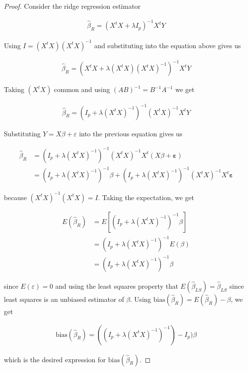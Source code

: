 \documentclass[paper=a4, fontsize=11pt]{scrartcl} %
\numberwithin{equation}{section} %
\begin{document}
\begin{proof}

Consider the ridge regression estimator

\begin{align}
\hat{\beta}_R = (X^t X + \lambda I_p)^{-1} X^t Y
\end{align}

Using $I = (X^t X)(X^t X)^{-1}$ and substituting into the equation above gives us

\begin{align}
\hat{\beta}_R = (X^t X + \lambda (X^t X)(X^t X)^{-1})^{-1} X^t Y
\end{align}

Taking $(X^t X)$ common and using $(AB)^{-1} = B^{-1}A^{-1}$ we get

\begin{align}
\hat{\beta}_R = (I_p + \lambda (X^t X)^{-1})^{-1} (X^t X)^{-1} X^t Y 
\end{align}

Substituting $Y = X \beta + \varepsilon$ into the previous equation gives us

\begin{align}
\hat{\beta}_R &= (I_p + \lambda (X^t X)^{-1})^{-1} (X^t X)^{-1} X^t (X \beta + \bm{\varepsilon} ) \\
			  &=(I_p + \lambda (X^t X)^{-1})^{-1} \beta + (I_p + \lambda (X^t X)^{-1})^{-1} (X^t X)^{-1} X^t \bm{\varepsilon}
\end{align}

because $(X^t X)^{-1} (X^t X) = I$.  Taking the expectation, we get

\begin{align}
E(\hat{\beta}_R) &= E[(I_p + \lambda (X^t X)^{-1})^{-1} \beta] \\
				 &= (I_p + \lambda (X^t X)^{-1})^{-1} E(\beta) \\
				 &= (I_p + \lambda (X^t X)^{-1})^{-1} \beta
\end{align}

since $E(\varepsilon) = 0$ and using the least squares property that $E(\hat{\beta}_{LS}) = \hat{\beta}_{LS}$ since least squares is an unbiased estimator of $\beta$. Using $\textrm{bias}(\hat{\beta}_R) = E(\hat{\beta}_R) - \beta$, we get

\begin{align}
\textrm{bias}(\hat{\beta}_R) = ((I_p + \lambda (X^t X)^{-1})^{-1}) - I_p) \beta
\end{align}

which is the desired expression for $\textrm{bias}(\hat{\beta}_R)$.
\end{proof}
\end{document}

